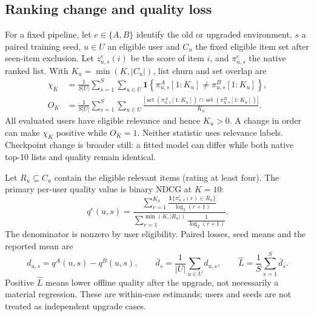 \subsection{Ranking change and quality loss}
For a fixed pipeline, let $e\in\{A,B\}$ identify the old or upgraded
environment, $s$ a paired training seed, $u\in U$ an eligible user and $C_u$
the fixed eligible item set after seen-item exclusion. Let $z^e_{u,s}(i)$ be
the score of item $i$, and $\pi^e_{u,s}$ the native ranked list. With
$K_u=\min(K,|C_u|)$, list churn and set overlap are
\begin{align}
 \chi_K &= \frac{1}{S|U|}\sum_{s=1}^{S}\sum_{u\in U}
  \mathbf{1}\!\left\{\pi^A_{u,s}[1{:}K_u]\ne
                         \pi^B_{u,s}[1{:}K_u]\right\}, \label{eq:churn}\\
 O_K &= \frac{1}{S|U|}\sum_{s=1}^{S}\sum_{u\in U}
  \frac{|\operatorname{set}(\pi^A_{u,s}[1{:}K_u])\cap
          \operatorname{set}(\pi^B_{u,s}[1{:}K_u])|}{K_u}.
  \label{eq:overlap}
\end{align}
All evaluated users have eligible relevance and hence $K_u>0$. A change in
order can make $\chi_K$ positive while $O_K=1$. Neither statistic uses relevance
labels. Checkpoint change is broader still: a fitted model can differ while
both native top-10 lists and quality remain identical.

Let $R_u\subseteq C_u$ contain the eligible relevant items (rating at least
four). The primary per-user quality value is binary NDCG at $K=10$:
\begin{equation}
 q^e(u,s)=
 \frac{\displaystyle\sum_{r=1}^{K_u}
    \frac{\mathbf{1}\{\pi^e_{u,s}(r)\in R_u\}}{\log_2(r+1)}}
 {\displaystyle\sum_{r=1}^{\min(K,|R_u|)}\frac{1}{\log_2(r+1)}}.
 \label{eq:ndcg}
\end{equation}
The denominator is nonzero by user eligibility. Paired losses, seed means and
the reported mean are
\begin{equation}
 d_{u,s}=q^A(u,s)-q^B(u,s),\qquad
 \bar d_s=\frac{1}{|U|}\sum_{u\in U}d_{u,s},\qquad
 \widehat L=\frac{1}{S}\sum_{s=1}^{S}\bar d_s.
 \label{eq:loss}
\end{equation}
Positive $\widehat L$ means lower offline quality after the upgrade, not
necessarily a material regression. These are within-case estimands; users and
seeds are not treated as independent upgrade cases.

